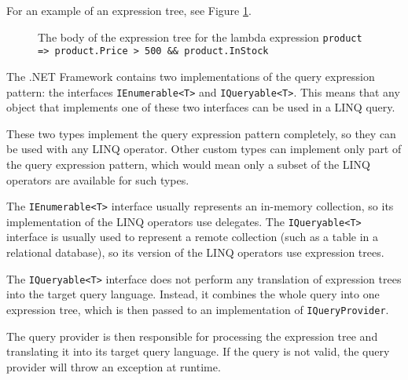 For an example of an expression tree, see Figure \ref{Expression tree}.

\begin{figure}[htbp]
\begin{center}
\end{center}

\caption[Example body of expression tree]
{The body of the expression tree for the lambda expression \lstinline,product => product.Price > 500 && product.InStock,}
\label{Expression tree}
\end{figure}

The .NET Framework contains two implementations of the query expression pattern:
the interfaces \lstinline,IEnumerable<T>, and \lstinline,IQueryable<T>,.
This means that any object that implements one of these two interfaces can be used in a \ac{LINQ} query.

These two types implement the query expression pattern completely,
so they can be used with any \ac{LINQ} operator.
Other custom types can implement only part of the query expression pattern,
which would mean only a subset of the \ac{LINQ} operators are available for such types.

The \lstinline,IEnumerable<T>, interface usually represents an in-memory collection,
so its implementation of the \ac{LINQ} operators use delegates.
The \lstinline,IQueryable<T>, interface is usually used to represent a remote collection
(such as a table in a relational database),
so its version of the \ac{LINQ} operators use expression trees.

The \lstinline,IQueryable<T>, interface does not perform any translation of expression trees
into the target query language.
Instead, it combines the whole query into one expression tree,
which is then passed to an implementation of \lstinline,IQueryProvider,.

The query provider is then responsible for processing the expression tree
and translating it into its target query language.
If the query is not valid, the query provider will throw an exception at runtime.